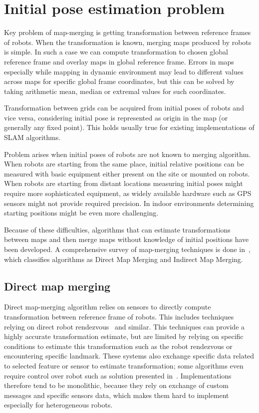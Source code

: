 \chapter{Initial pose estimation problem}
\label{chap:map-merging-intro}

Key problem of map-merging is getting transformation between reference frames of robots. When the transformation is known, merging maps produced by robots is simple. In such a case we can compute transformation to chosen global reference frame and overlay maps in global reference frame. Errors in maps especially while mapping in dynamic environment may lead to different values across maps for specific global frame coordinates, but this can be solved by taking arithmetic mean, median or extremal values for such coordinates.

Transformation between grids can be acquired from initial poses of robots and vice versa, considering initial pose is represented as origin in the map (or generally any fixed point). This holds usually true for existing implementations of \gls{SLAM} algorithms.

Problem arises when initial poses of robots are not known to merging algorithm. When robots are starting from the same place, initial relative positions can be measured with basic equipment either present on the site or mounted on robots. When robots are starting from distant locations measuring initial poses might require more sophisticated equipment, as widely available hardware such as \gls{GPS} sensors might not provide required precision. In indoor environments determining starting positions might be even more challenging.

Because of these difficulties, algorithms that can estimate transformations between maps and then merge maps without knowledge of initial positions have been developed. A comprehensive survey of map-merging techniques is done in~\cite{Lee2012}, which classifies algorithms as Direct Map Merging and Indirect Map Merging.

\section{Direct map merging}

Direct map-merging algorithm relies on sensors to directly compute transformation between reference frame of robots. This includes techniques relying on direct robot rendezvous~\cite{Zhou2006} and similar. This techniques can provide a highly accurate transformation estimate, but are limited by relying on specific conditions to estimate this transformation such as the robot rendezvous or encountering specific landmark. These systems also exchange specific data related to selected feature or sensor to estimate transformation; some algorithms even require control over robot such as solution presented in~\cite{Konolige2003}. Implementations therefore tend to be monolithic, because they rely on exchange of custom messages and specific sensors data, which makes them hard to implement especially for heterogeneous robots.

